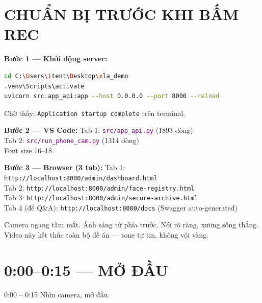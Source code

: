 \documentclass[12pt, a4paper]{article}
\newcommand{\fpath}[1]{\texttt{\textcolor{purple}{#1}}}
\begin{document}
\tableofcontents\newpage

\section{CHUẨN BỊ TRƯỚC KHI BẤM REC}

\begin{doact}
\textbf{Bước 1 --- Khởi động server:}
\begin{lstlisting}[language=bash, numbers=none]
cd C:\Users\itent\Desktop\xla_demo
.venv\Scripts\activate
uvicorn src.app_api:app --host 0.0.0.0 --port 8000 --reload
\end{lstlisting}
Chờ thấy: \texttt{Application startup complete} trên terminal.
\end{doact}

\begin{doact}
\textbf{Bước 2 --- VS Code:}
Tab 1: \fpath{src/app\_api.py} (1893 dòng)\\
Tab 2: \fpath{src/run\_phone\_cam.py} (1314 dòng)\\
Font size 16--18.
\end{doact}

\begin{doact}
\textbf{Bước 3 --- Browser (3 tab):}
Tab 1: \texttt{http://localhost:8000/admin/dashboard.html}\\
Tab 2: \texttt{http://localhost:8000/admin/face-registry.html}\\
Tab 3: \texttt{http://localhost:8000/admin/secure-archive.html}\\
Tab 4 (để Q\&A): \texttt{http://localhost:8000/docs} (Swagger auto-generated)
\end{doact}

\begin{cam}
Camera ngang tầm mắt. Ánh sáng từ phía trước. Nói rõ ràng, xương sống thẳng.
Video này kết thúc toàn bộ đề án --- tone tự tin, không vội vàng.
\end{cam}

\newpage
\section{0:00--0:15 --- MỞ ĐẦU}

\begin{timing}{0:00 -- 0:15}
Nhìn camera, mở đầu.
\end{timing}
\end{document}
